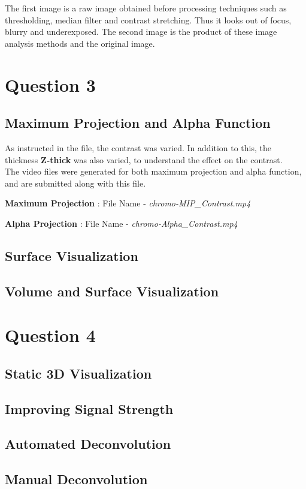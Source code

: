 \documentclass{article}
\begin{document}
The first image is a raw image obtained before processing techniques such as thresholding, median filter and contrast stretching. Thus it looks out of focus, blurry and underexposed. The second image is the product of these image analysis methods and the original image. 




\section*{Question 3}
\subsection*{Maximum Projection and Alpha Function}
As instructed in the file, the contrast was varied. In addition to this, the thickness \textbf{Z-thick} was also varied, to understand the effect on the contrast. \\The video files were generated for both maximum projection and alpha function, and are submitted along with this file. 

\medskip

\textbf{Maximum Projection} : File Name - \textit{chromo-MIP\_Contrast.mp4}

\textbf{Alpha Projection} : File Name - \textit{chromo-Alpha\_Contrast.mp4}
\subsection*{Surface Visualization}
\subsection*{Volume and Surface Visualization}
\section*{Question 4}
\subsection*{Static 3D Visualization}
\subsection*{Improving Signal Strength}
\subsection*{Automated Deconvolution}
\subsection*{Manual Deconvolution}
\end{document}
